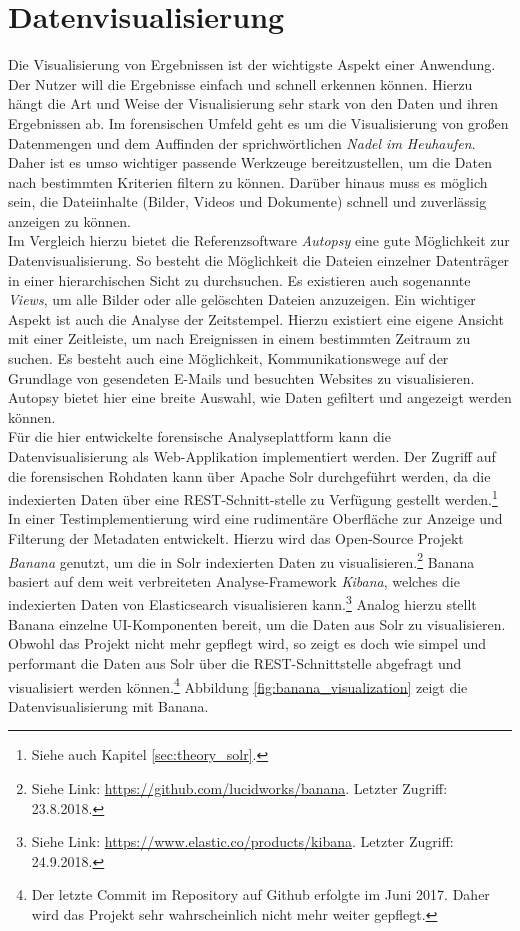 \chapter{Datenvisualisierung}
\label{ch:data_visualization}

Die Visualisierung von Ergebnissen ist der wichtigste Aspekt einer Anwendung. Der Nutzer will die Ergebnisse einfach und schnell erkennen können. Hierzu hängt die Art und Weise der Visualisierung sehr stark von den Daten und ihren Ergebnissen ab. Im forensischen Umfeld geht es um die Visualisierung von großen Datenmengen und dem Auffinden der sprichwörtlichen \textit{Nadel im Heuhaufen}. Daher ist es umso wichtiger passende Werkzeuge bereitzustellen, um die Daten nach bestimmten Kriterien filtern zu können. Darüber hinaus muss es möglich sein, die Dateiinhalte (Bilder, Videos und  Dokumente) schnell und zuverlässig anzeigen zu können.\\

\noindent
Im Vergleich hierzu bietet die Referenzsoftware \textit{Autopsy} eine gute Möglichkeit zur Datenvisualisierung. So besteht die Möglichkeit die Dateien einzelner Datenträger in einer hierarchischen Sicht zu durchsuchen. Es existieren auch sogenannte \textit{Views}, um alle Bilder oder alle gelöschten Dateien anzuzeigen. Ein wichtiger Aspekt ist auch die Analyse der Zeitstempel. Hierzu existiert eine eigene Ansicht mit einer Zeitleiste, um nach Ereignissen in einem bestimmten Zeitraum zu suchen. Es besteht auch eine Möglichkeit, Kommunikationswege auf der Grundlage von gesendeten E-Mails und besuchten Websites zu visualisieren. Autopsy bietet hier eine breite Auswahl, wie Daten gefiltert und angezeigt werden können.\\

\noindent
Für die hier entwickelte forensische Analyseplattform kann die Datenvisualisierung als Web-Applikation implementiert werden. Der Zugriff auf die forensischen Rohdaten kann über Apache Solr durchgeführt werden, da die indexierten Daten über eine REST-Schnitt-stelle zu Verfügung gestellt werden.\footnote{Siehe auch Kapitel \ref{sec:theory_solr}.}\\

\noindent
In einer Testimplementierung wird eine rudimentäre Oberfläche zur Anzeige und Filterung der Metadaten entwickelt. Hierzu wird das Open-Source Projekt \textit{Banana} genutzt, um die in Solr indexierten Daten zu visualisieren.\footnote{Siehe Link: \url{https://github.com/lucidworks/banana}. Letzter Zugriff: 23.8.2018.} Banana basiert auf dem weit verbreiteten Analyse-Framework \textit{Kibana}, welches die indexierten Daten von Elasticsearch visualisieren kann.\footnote{Siehe Link: \url{https://www.elastic.co/products/kibana}. Letzter Zugriff: 24.9.2018.} Analog hierzu stellt Banana einzelne UI-Komponenten bereit, um die Daten aus Solr zu visualisieren. Obwohl das Projekt nicht mehr gepflegt wird, so zeigt es doch wie simpel und performant die Daten aus Solr über die REST-Schnittstelle abgefragt und visualisiert werden können.\footnote{Der letzte Commit im Repository auf Github erfolgte im Juni 2017. Daher wird das Projekt sehr wahrscheinlich nicht mehr weiter gepflegt.}
Abbildung \ref{fig:banana_visualization} zeigt die Datenvisualisierung mit Banana.

